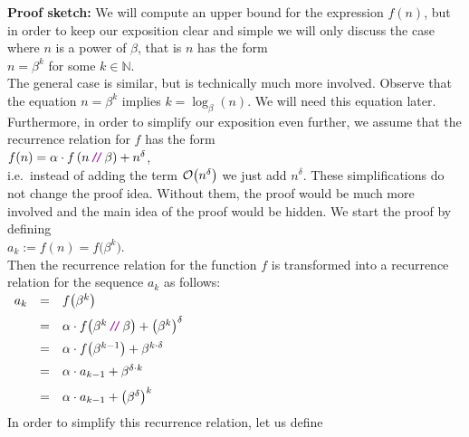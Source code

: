 \noindent
\textbf{Proof sketch:}
We will compute an upper bound for the expression $f(n)$, but in order to keep our exposition clear
and simple we will only discuss the case where $n$ is a power of $\beta$, that is $n$ has the form
\\[0.2cm]
\hspace*{1.3cm}
$n = \beta^k$ \quad for some $k \in \mathbb{N}$.
\\[0.2cm]
The general case is similar, but is technically much more involved.
Observe that the equation $n = \beta^k$ implies $k = \log_{\beta}(n)$.  We will need this equation later. 
Furthermore, in order to simplify our exposition even further, we assume that the recurrence
relation for $f$ has the form 
\\[0.2cm]
\hspace*{1.3cm}
 $f(n) = \alpha \cdot f\left(n \dv \beta\right) + n^\delta$,
\\[0.2cm]
i.e.~instead of adding the term $\mathcal{O}\bigl(n^\delta\bigr)$ we just add $n^\delta$.  These
simplifications do not change the proof idea.  Without them, the proof would be much more involved and the main
idea of the proof would be hidden.  We start the proof by defining
\\[0.2cm]
\hspace*{1.3cm}
 $a_k := f(n) = f\bigl(\beta^k\bigr)$.  
\\[0.2cm]
Then the recurrence relation for the function $f$
is transformed into a recurrence relation for the sequence $a_k$ as follows:
\\[0.2cm]
\hspace*{1.3cm}
$
\begin{array}[t]{lcl}
a_k & = & f\bigl(\beta^{k}\bigr)                                             \\[0.2cm]
    & = & \alpha \cdot f\bigl(\beta^{k} \dv \beta\bigr) + \bigl(\beta^{k}\bigr)^\delta    \\[0.2cm]
    & = & \alpha \cdot f\bigl(\beta^{k-1}\bigr) + \beta^{k \cdot \delta}    \\[0.2cm]
    & = & \alpha \cdot a_{k-1} + \beta^{\delta \cdot k}    \\[0.2cm]
    & = & \alpha \cdot a_{k-1} + \bigl(\beta^{\delta}\bigr)^k    \\[0.2cm]
\end{array}
$
\\[0.2cm]
In order to simplify this recurrence relation, let us define
\\[0.2cm]
\hspace*{1.3cm}
